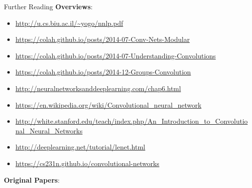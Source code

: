 \documentclass[xcolor=pdftex,x11names,table,hyperref]{beamer}
\begin{document}
\begin{frame}{Further Reading}
\textbf{Overviews}:
\begin{tiny}
\begin{itemize}
	\item \url{http://u.cs.biu.ac.il/~yogo/nnlp.pdf}
	\item \url{https://colah.github.io/posts/2014-07-Conv-Nets-Modular}
	\item \url{https://colah.github.io/posts/2014-07-Understanding-Convolutions}
	\item \url{https://colah.github.io/posts/2014-12-Groups-Convolution}
	\item \url{http://neuralnetworksanddeeplearning.com/chap6.html}
	\item \url{https://en.wikipedia.org/wiki/Convolutional_neural_network}
	\item \url{http://white.stanford.edu/teach/index.php/An_Introduction_to_Convolutional_Neural_Networks}
	\item \url{http://deeplearning.net/tutorial/lenet.html}
	\item \url{https://cs231n.github.io/convolutional-networks}
\end{itemize}
\end{tiny}
\textbf{Original Papers}:
\begin{description}
	\item 
\end{description}
\end{frame}





\end{document}
